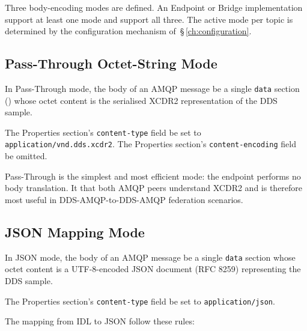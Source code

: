 \documentclass{../styles/zerodds-vendor-spec}
\begin{document}
Three body-encoding modes are defined. An Endpoint or Bridge
implementation  support at least one mode and
 support all three. The active mode per topic
is determined by the configuration mechanism
of~\S\,\ref{ch:configuration}.

\subsection{Pass-Through Octet-String Mode}\label{sec:psm-passthrough}

In Pass-Through mode, the body of an AMQP message
 be a single \texttt{data} section
() whose octet content is the
serialised XCDR2 representation of the DDS sample.

The Properties section's \texttt{content-type} field
 be set to
\texttt{application/vnd.dds.xcdr2}. The Properties section's
\texttt{content-encoding} field  be omitted.

\begin{specnote}
Pass-Through is the simplest and most efficient mode: the
endpoint performs no body translation. It  that
both AMQP peers understand XCDR2 and is therefore most useful in
DDS-AMQP-to-DDS-AMQP federation scenarios.
\end{specnote}

\subsection{JSON Mapping Mode}\label{sec:psm-json}

In JSON mode, the body of an AMQP message  be a single
\texttt{data} section whose octet content is a UTF-8-encoded JSON
document (RFC 8259) representing the DDS sample.

The Properties section's \texttt{content-type} field
 be set to \texttt{application/json}.

The mapping from IDL to JSON  follow these rules:
\end{document}
